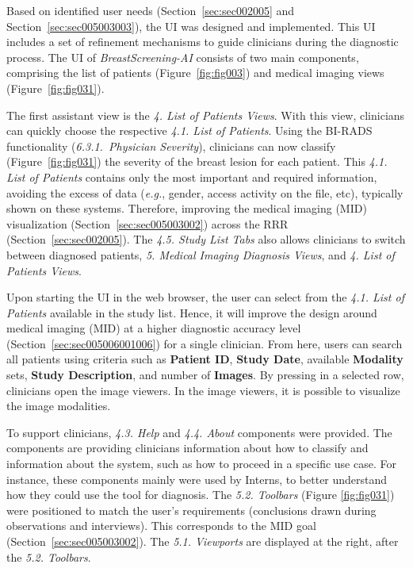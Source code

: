 Based on identified user needs (Section~\ref{sec:sec002005} and Section~\ref{sec:sec005003003}), the \ac{UI} was designed and implemented.
This \ac{UI} includes a set of refinement mechanisms to guide clinicians during the diagnostic process.
The \ac{UI} of {\it BreastScreening-AI} consists of two main components, comprising the list of patients (Figure~\ref{fig:fig003}) and medical imaging views (Figure~\ref{fig:fig031}).

The first assistant view is the {\it 4. List of Patients Views}.
With this view, clinicians can quickly choose the respective {\it 4.1. List of Patients}.
Using the \ac{BI-RADS} functionality ({\it 6.3.1.~Physician Severity}), clinicians can now classify (Figure~\ref{fig:fig031}) the severity of the breast lesion for each patient.
This {\it 4.1. List of Patients} contains only the most important and required information, avoiding the excess of data ({\it e.g.}, gender, access activity on the file, etc), typically shown on these systems.
Therefore, improving the medical imaging (\ac{MID}) visualization (Section~\ref{sec:sec005003002}) across the \ac{RRR} (Section~\ref{sec:sec002005}).
The {\it 4.5. Study List Tabs} also allows clinicians to switch between diagnosed patients, {\it 5. Medical Imaging Diagnosis Views}, and {\it 4. List of Patients Views}.

Upon starting the \ac{UI} in the web browser, the user can select from the {\it 4.1. List of Patients} available in the study list.
Hence, it will improve the design around medical imaging (\ac{MID}) at a higher diagnostic accuracy level (Section~\ref{sec:sec005006001006}) for a single clinician.
From here, users can search all patients using criteria such as {\bf Patient ID}, {\bf Study Date}, available {\bf Modality} sets, {\bf Study Description}, and number of {\bf Images}.
By pressing in a selected row, clinicians open the image viewers.
In the image viewers, it is possible to visualize the image modalities.

To support clinicians, {\it 4.3. Help} and {\it 4.4. About} components were provided.
The components are providing clinicians information about how to classify and information about the system, such as how to proceed in a specific use case.
For instance, these components mainly were used by Interns, to better understand how they could use the tool for diagnosis.
The {\it 5.2. Toolbars} (Figure \ref{fig:fig031}) were positioned to match the user's requirements (conclusions drawn during observations and interviews).
This corresponds to the MID goal (Section~\ref{sec:sec005003002}).
The {\it 5.1. Viewports} are displayed at the right, after the {\it 5.2. Toolbars}.

